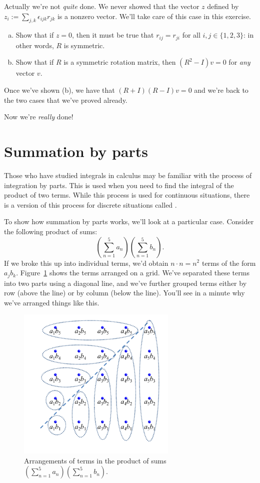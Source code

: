 \begin{exercise}{}
Actually we're not \emph{quite} done. We never showed that the vector $z$ defined by $z_i := \sum_{j,k} \epsilon_{ijk} r_{jk}$ is a nonzero vector. We'll take care of this case in this exercise.
\begin{enumerate}[(a)]
\item
Show that if $z=0$, then it must be true that $r_{ij}=r_{ji}$ for all $i,j \in \{1,2,3\}$: in other words, $R$ is symmetric.
\item
Show that if $R$ is a symmetric rotation matrix, then $(R^2 - I) v = 0$ for \emph{any} vector $v$.
\end{enumerate}
Once we've shown (b), we have that $(R+I)(R-I)v=0$ and we're back to the two cases that we've proved already.
\end{exercise}

Now we're \emph{really} done!


\section{Summation by parts}\label{sec:sumByParts}

Those who have studied integrals in calculus may be familiar with the process of integration by parts.  This is used when you need to find the integral of the product of two terms.  While this process is used for continuous situations, there is a version of this process for discrete situations called .  

To show how summation by parts works, we'll look at a particular case. Consider the following product of sums:
\[\left( \sum_{n=1}^{5}a_{n} \right) \left( \sum_{n=1}^{5}b_{n} \right). \] 
If we broke this up into individual terms, we'd obtain $n \cdot n = n^2$ terms of the form $a_j b_k$.  Figure~\ref{fig:IBP}
shows the terms arranged on a grid. We've separated these terms into two parts using  a diagonal line, and we've further
grouped terms either by row (above the line) or by column (below the line). You'll see in a minute why we've arranged things like this.

\begin{figure}[htb]
\begin{center}
	\includegraphics[width=3.0in]{images/IBP.png}
\caption{\label{fig:IBP} Arrangements of terms in the product of sums $\left( \sum_{n=1}^{5}a_{n} \right) \left( \sum_{n=1}^{5}b_{n} \right)$.}
\end{center}
\end{figure} 


